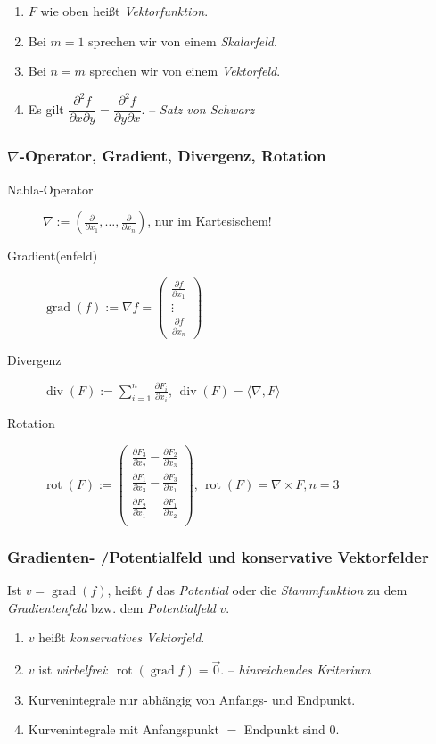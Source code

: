 \documentclass[a4paper, 9pt, DIV=24]{scrartcl}
\DeclareMathOperator{\grad}{grad}
\DeclareMathOperator{\rot}{rot}
\DeclareMathOperator{\Div}{div}
\begin{document}
\begin{enumerate}[label={(}\arabic*{)}]
 \item $F$ wie oben heißt \emph{Vektorfunktion}.
 \item Bei $m = 1$ sprechen wir von einem \emph{Skalarfeld}.
 \item Bei $n = m$ sprechen wir von einem \emph{Vektorfeld}.
 \item Es gilt $\dfrac{\partial^2 f}{\partial x\partial y} = \dfrac{\partial^2 f}{\partial y\partial x}$. -- \emph{Satz von Schwarz}
\end{enumerate}

\subsubsection{$\nabla$-Operator, Gradient, Divergenz, Rotation}
\begin{description}
 \item[Nabla-Operator] $\nabla := (\frac{\partial}{\partial x_1},\dots,\frac{\partial}{\partial x_n})$, nur im Kartesischem!
 \item[Gradient(enfeld)] $\grad(f) := \nabla f = \begin{pmatrix}\frac{\partial f}{\partial x_1} \\\vdots\\ \frac{\partial f}{\partial x_n}\end{pmatrix}$
 \item[Divergenz] $\Div(F) := \sum_{i=1}^n\frac{\partial F_i}{\partial x_i},\, \Div(F) = \langle \nabla, F \rangle$
 \item[Rotation] $\rot(F) := \begin{pmatrix}
\frac{\partial F_3}{\partial x_2} - \frac{\partial F_2}{\partial x_3} \\
\frac{\partial F_1}{\partial x_3} - \frac{\partial F_3}{\partial x_1} \\
\frac{\partial F_2}{\partial x_1} - \frac{\partial F_1}{\partial x_2} \\
\end{pmatrix},\, \rot(F) = \nabla \times F, n = 3$
\end{description}

\subsubsection{Gradienten- /Potentialfeld und konservative Vektorfelder}
Ist $v = \grad(f)$, heißt $f$ das \emph{Potential} oder die \emph{Stammfunktion} zu dem \emph{Gradientenfeld} bzw. dem \emph{Potentialfeld} $v$.
\begin{enumerate}[label={(}\arabic*{)}]
 \item $v$ heißt \emph{konservatives Vektorfeld}.
 \item $v$ ist \emph{wirbelfrei}: $\rot(\grad f) = \vec{0}$. -- \emph{hinreichendes Kriterium}
 \item Kurvenintegrale nur abhängig von Anfangs- und Endpunkt.
 \item Kurvenintegrale mit Anfangspunkt $=$ Endpunkt sind $0$.
\end{enumerate}
\end{document}
